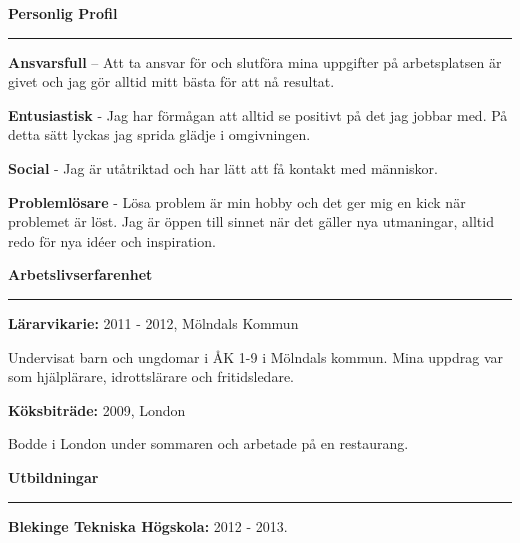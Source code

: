 \documentclass[12pt , a4paper]{article}
\begin{document}
	\begin{flushleft}
	
		\vspace{24pt}
		\vspace{24pt}
		{\large \textbf{Personlig Profil}}
		\hrule		
		
		\vspace{12pt}
		\textbf{Ansvarsfull} – Att ta ansvar för och slutföra mina uppgifter på arbetsplatsen är givet och jag gör 
alltid mitt bästa för att nå resultat.

			\vspace{3 pt}
	    	\textbf{Entusiastisk} - Jag har förmågan att alltid se positivt på det jag jobbar med. På detta sätt 
lyckas jag sprida glädje i omgivningen.
	    	
			\vspace{3 pt}
 		    \textbf{Social} - Jag är utåtriktad och har lätt att få kontakt med människor. 			
			
			\vspace{3 pt}
 		    \textbf{Problemlösare} - Lösa problem är min hobby 
 		    och det ger mig en kick när problemet är löst. Jag är öppen till sinnet när 
det gäller nya utmaningar, alltid redo för nya idéer och inspiration. 

		\vspace{12pt}		
		{\large \textbf{Arbetslivserfarenhet}}
		\hrule
		\vspace{6pt}
				
		\textbf{Lärarvikarie: } 2011 - 2012,	Mölndals Kommun
		
Undervisat barn och ungdomar i ÅK 1-9 i Mölndals 
kommun. Mina uppdrag var som hjälplärare, idrottslärare och 
fritidsledare. 
		
		\vspace{6pt}
		\textbf{Köksbiträde: } 2009, London
		
		Bodde i London under sommaren och arbetade på en restaurang. 
		
		\vspace{12pt}
		{\large \textbf{Utbildningar}}
		\hrule
		
		
		\vspace{6pt}
		
		 \textbf{Blekinge Tekniska Högskola: } 2012 - 2013. 
		

\end{flushleft}
\end{document}
